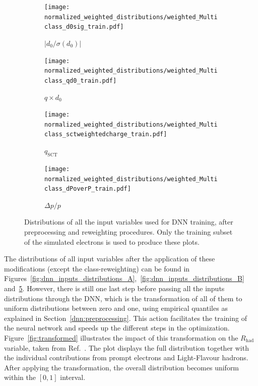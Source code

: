 \begin{figure}[htbp]
  \centering

  \begin{subfigure}[b]{0.47\textwidth}
    \centering
    \texttt{[image: normalized\_weighted\_distributions/weighted\_Multiclass\_d0sig\_train.pdf]}
    \caption{$|d_0/\sigma(d_0)|$}
    \label{fig:input16}
  \end{subfigure}\hfill
  \begin{subfigure}[b]{0.47\textwidth}
    \centering
    \texttt{[image: normalized\_weighted\_distributions/weighted\_Multiclass\_qd0\_train.pdf]}
    \caption{$q \times d_0$}
    \label{fig:input14}
  \end{subfigure}

  \vspace{0.45cm}

  \begin{subfigure}[b]{0.47\textwidth}
    \centering
    \texttt{[image: normalized\_weighted\_distributions/weighted\_Multiclass\_sctweightedcharge\_train.pdf]}
    \caption{$q_{\text{SCT}}$}
    \label{fig:input15}
  \end{subfigure}\hfill
  \begin{subfigure}[b]{0.47\textwidth}
    \centering
    \texttt{[image: normalized\_weighted\_distributions/weighted\_Multiclass\_dPoverP\_train.pdf]}
    \caption{$\Delta p/p$}
    \label{fig:input17}
  \end{subfigure}

  \caption{Distributions of all the input variables used for DNN training, after preprocessing and reweighting procedures. Only the training subset of the simulated electrons is used to produce these plots.}
  \label{fig:dnn_inputs_distributions_C}
\end{figure}

The distributions of all input variables after the application of these modifications (except the class-reweighting) can be found in Figures~\ref{fig:dnn_inputs_distributions_A},~\ref{fig:dnn_inputs_distributions_B} and~\ref{fig:dnn_inputs_distributions_C}. However, there is still one last step before passing all the inputs distributions through the DNN, which is the transformation of all of them to uniform distributions between zero and one, using empirical quantiles as explained in Section~\ref{dnn:preprocessing}. This action facilitates the training of the neural network and speeds up the different steps in the optimization.
Figure~\ref{fig:transformed} illustrates the impact of this transformation on the $R_{\text{had}}$ variable, taken from Ref.~\cite{dnn_paper}. The plot displays the full distribution together with the individual contributions from prompt electrons and Light-Flavour hadrons. After applying the transformation, the overall distribution becomes uniform within the $[0,1]$ interval.


